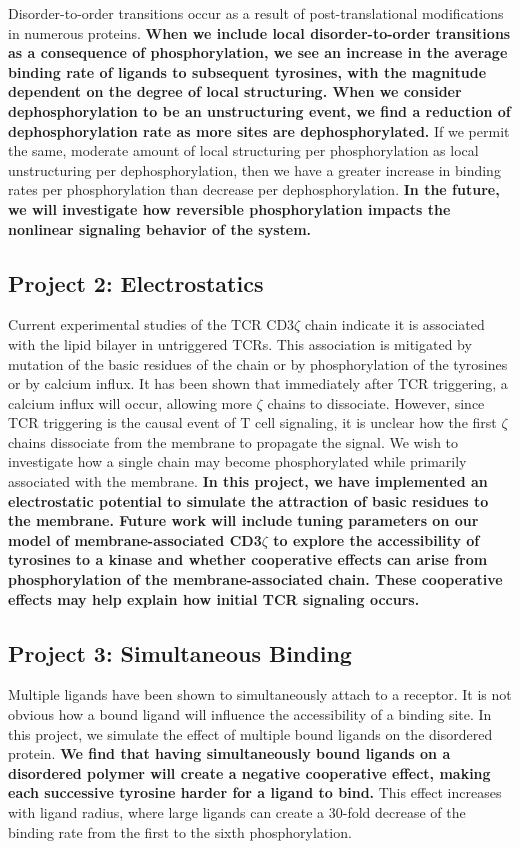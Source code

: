 \documentclass[onecolumn]{article}
\begin{document}
Disorder-to-order transitions occur as a result of post-translational modifications in numerous proteins. \textbf{When we include local disorder-to-order transitions as a consequence of phosphorylation, we see an increase in the average binding rate of ligands to subsequent tyrosines, with the magnitude dependent on the degree of local structuring. When we consider dephosphorylation to be an unstructuring event, we find a reduction of dephosphorylation rate as more sites are dephosphorylated.} If we permit the same, moderate amount of local structuring per phosphorylation as local unstructuring per dephosphorylation, then we have a greater increase in binding rates per phosphorylation than decrease per dephosphorylation. \textbf{In the future, we will investigate how reversible phosphorylation impacts the nonlinear signaling behavior of the system.}

\subsection*{Project 2: Electrostatics}

Current experimental studies of the TCR CD3$\zeta$ chain indicate it is associated with the lipid bilayer in untriggered TCRs. This association is mitigated by mutation of the basic residues of the chain or by phosphorylation of the tyrosines or by calcium influx. It has been shown that immediately after TCR triggering, a calcium influx will occur, allowing more $\zeta$ chains to dissociate. However, since TCR triggering is the causal event of T cell signaling, it is unclear how the first $\zeta$ chains dissociate from the membrane to propagate the signal. We wish to investigate how a single chain may become phosphorylated while primarily associated with the membrane. \textbf{In this project, we have implemented an electrostatic potential to simulate the attraction of basic residues to the membrane. Future work will include tuning parameters on our model of membrane-associated CD3$\zeta$ to explore the accessibility of tyrosines to a kinase and whether cooperative effects can arise from phosphorylation of the membrane-associated chain. These cooperative effects may help explain how initial TCR signaling occurs.}

\subsection*{Project 3: Simultaneous Binding}

Multiple ligands have been shown to simultaneously attach to a receptor. It is not obvious how a bound ligand will influence the accessibility of a binding site. In this project, we simulate the effect of multiple bound ligands on the disordered protein. \textbf{We find that having simultaneously bound ligands on a disordered polymer will create a negative cooperative effect, making each successive tyrosine harder for a ligand to bind.} This effect increases with ligand radius, where large ligands can create a 30-fold decrease of the binding rate from the first to the sixth phosphorylation.
\end{document}
